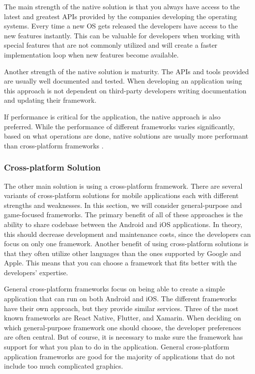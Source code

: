 \documentclass[../Main.tex]{subfiles}
\begin{document}
The main strength of the native solution is that you always have access to the latest and greatest APIs provided by the companies developing the operating systems. Every time a new OS gets released the developers have access to the new features instantly. This can be valuable for developers when working with special features that are not commonly utilized and will create a faster implementation loop when new features become available.

Another strength of the native solution is maturity. The APIs and tools provided are usually well documented and tested. When developing an application using this approach is not dependent on third-party developers writing documentation and updating their framework. 

If performance is critical for the application, the native approach is also preferred. While the performance of different frameworks varies significantly, based on what operations are done, native solutions are usually more performant than cross-platform frameworks \citep{biorn-hansen_empirical_2020}.


\subsubsection{Cross-platform Solution}
The other main solution is using a cross-platform framework. There are several variants of cross-platform solutions for mobile applications each with different strengths and weaknesses. In this section, we will consider general-purpose and game-focused frameworks. The primary benefit of all of these approaches is the ability to share codebase between the Android and iOS applications. In theory, this should decrease development and maintenance costs, since the developers can focus on only one framework. Another benefit of using cross-platform solutions is that they often utilize other languages than the ones supported by Google and Apple. This means that you can choose a framework that fits better with the developers’ expertise.

General cross-platform frameworks focus on being able to create a simple application that can run on both Android and iOS. The different frameworks have their own approach, but they provide similar services. Three of the most known frameworks are React Native, Flutter, and Xamarin. When deciding on which general-purpose framework one should choose, the developer preferences are often central. But of course, it is necessary to make sure the framework has support for what you plan to do in the application. General cross-platform application frameworks are good for the majority of applications that do not include too much complicated graphics.
\end{document}
